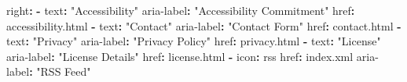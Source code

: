 \documentclass[
  doc,
  floatsintext,
  longtable,
  a4paper,
  nolmodern,
  notxfonts,
  notimes,
  12pt,
  colorlinks=true,linkcolor=blue,citecolor=blue,urlcolor=blue]{apa7}
\newenvironment{Shaded}{\begin{snugshade}}{\end{snugshade}}
\newcommand{\AttributeTok}[1]{\textcolor[rgb]{0.40,0.45,0.13}{#1}}
\newcommand{\FunctionTok}[1]{\textcolor[rgb]{0.28,0.35,0.67}{#1}}
\newcommand{\KeywordTok}[1]{\textcolor[rgb]{0.00,0.23,0.31}{\textbf{#1}}}
\newcommand{\StringTok}[1]{\textcolor[rgb]{0.13,0.47,0.30}{#1}}
\begin{document}
\begin{Shaded}
\begin{Highlighting}[]
\AttributeTok{    }\FunctionTok{right}\KeywordTok{:}
\AttributeTok{      }\KeywordTok{{-}}\AttributeTok{ }\FunctionTok{text}\KeywordTok{:}\AttributeTok{ }\StringTok{"Accessibility"}
\AttributeTok{        }\FunctionTok{aria{-}label}\KeywordTok{:}\AttributeTok{ }\StringTok{"Accessibility Commitment"}
\AttributeTok{        }\FunctionTok{href}\KeywordTok{:}\AttributeTok{ accessibility.html}
\AttributeTok{      }\KeywordTok{{-}}\AttributeTok{ }\FunctionTok{text}\KeywordTok{:}\AttributeTok{ }\StringTok{"Contact"}
\AttributeTok{        }\FunctionTok{aria{-}label}\KeywordTok{:}\AttributeTok{ }\StringTok{"Contact Form"}
\AttributeTok{        }\FunctionTok{href}\KeywordTok{:}\AttributeTok{ contact.html}
\AttributeTok{      }\KeywordTok{{-}}\AttributeTok{ }\FunctionTok{text}\KeywordTok{:}\AttributeTok{ }\StringTok{"Privacy"}
\AttributeTok{        }\FunctionTok{aria{-}label}\KeywordTok{:}\AttributeTok{ }\StringTok{"Privacy Policy"}
\AttributeTok{        }\FunctionTok{href}\KeywordTok{:}\AttributeTok{ privacy.html}
\AttributeTok{      }\KeywordTok{{-}}\AttributeTok{ }\FunctionTok{text}\KeywordTok{:}\AttributeTok{ }\StringTok{"License"}
\AttributeTok{        }\FunctionTok{aria{-}label}\KeywordTok{:}\AttributeTok{ }\StringTok{"License Details"}
\AttributeTok{        }\FunctionTok{href}\KeywordTok{:}\AttributeTok{ license.html}
\AttributeTok{      }\KeywordTok{{-}}\AttributeTok{ }\FunctionTok{icon}\KeywordTok{:}\AttributeTok{ rss}
\AttributeTok{        }\FunctionTok{href}\KeywordTok{:}\AttributeTok{ index.xml}
\AttributeTok{        }\FunctionTok{aria{-}label}\KeywordTok{:}\AttributeTok{ }\StringTok{"RSS Feed"}


\end{Highlighting}
\end{Shaded}
\end{document}
